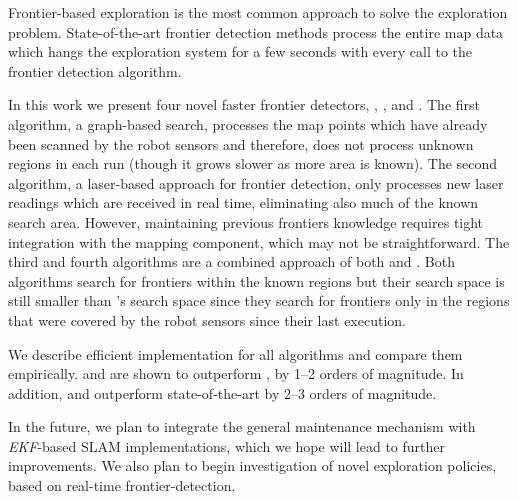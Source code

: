 

Frontier-based exploration is the most common approach to solve the exploration
problem. State-of-the-art frontier detection methods process the entire map data
which hangs the exploration system for a few seconds with every call to the
frontier detection algorithm. 

In this work we present four novel faster frontier detectors, \WFD, \FFD,
\WFDINC and \WFDIP. The first algorithm, a graph-based search, processes the map
points which have already been scanned by the robot sensors and therefore, does
not process unknown regions in each run (though it grows slower as more area is
known). The second algorithm, a laser-based approach for frontier detection,
only processes new laser readings which are received in real time, eliminating
also much of the known search area. However, maintaining previous frontiers
knowledge requires tight integration with the mapping component, which may not
be straightforward. The third and fourth algorithms are a combined approach of
both \WFD and \FFD. Both algorithms search for frontiers within the known
regions but their search space is still smaller than \WFD's search space since
they search for frontiers only in the regions that were covered by the robot
sensors since their last execution. 

We describe efficient implementation for all algorithms and compare them
empirically. \FFD and \WFDIP are shown to outperform \WFD, \WFDINC by 1--2
orders of magnitude. In addition, \FFD and \WFDIP outperform state-of-the-art by
2--3 orders of magnitude.

In the future, we plan to integrate the general maintenance mechanism with
\emph{EKF}-based SLAM implementations, which we hope will lead to further
improvements. We also plan to begin investigation of novel exploration policies,
based on real-time frontier-detection. 


